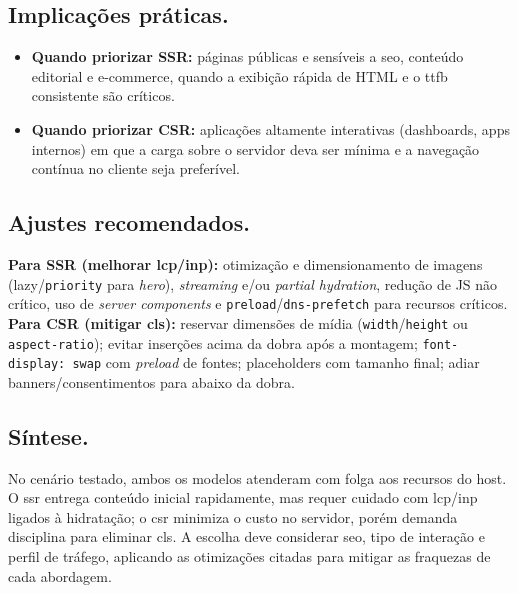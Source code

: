\subsection{Implicações práticas.}
\begin{itemize}
  \item \textbf{Quando priorizar SSR:} páginas públicas e sensíveis a \acrshort{seo}, conteúdo editorial e e-commerce, quando a exibição rápida de HTML e o \acrshort{ttfb} consistente são críticos.
  \item \textbf{Quando priorizar CSR:} aplicações altamente interativas (dashboards, apps internos) em que a carga sobre o servidor deva ser mínima e a navegação contínua no cliente seja preferível.
\end{itemize}

\subsection{Ajustes recomendados.}
\textbf{Para SSR (melhorar \acrshort{lcp}/\acrshort{inp}):} otimização e dimensionamento de imagens (lazy/\texttt{priority} para \textit{hero}), \textit{streaming} e/ou \textit{partial hydration}, redução de JS não crítico, uso de \textit{server components} e \texttt{preload}/\texttt{dns-prefetch} para recursos críticos.  
\textbf{Para CSR (mitigar \acrshort{cls}):} reservar dimensões de mídia (\texttt{width}/\texttt{height} ou \texttt{aspect-ratio}); evitar inserções acima da dobra após a montagem; \texttt{font-display: swap} com \textit{preload} de fontes; placeholders com tamanho final; adiar banners/consentimentos para abaixo da dobra.

\subsection{Síntese.}
No cenário testado, ambos os modelos atenderam com folga aos recursos do host. O \acrshort{ssr} entrega conteúdo inicial rapidamente, mas requer cuidado com \acrshort{lcp}/\acrshort{inp} ligados à hidratação; o \acrshort{csr} minimiza o custo no servidor, porém demanda disciplina para eliminar \acrshort{cls}. A escolha deve considerar \acrshort{seo}, tipo de interação e perfil de tráfego, aplicando as otimizações citadas para mitigar as fraquezas de cada abordagem.
